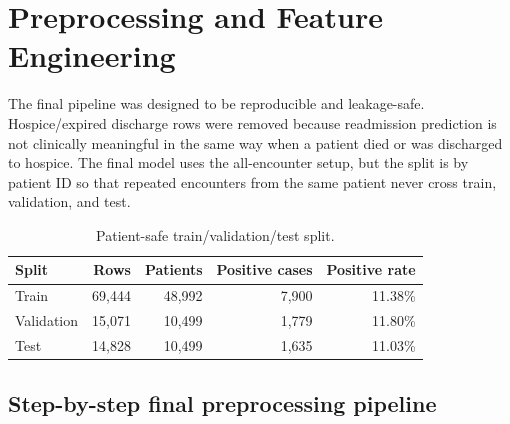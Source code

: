 \documentclass[10pt]{article}
\newcommand{\tightsection}[1]{\vspace{3pt}\section{#1}\vspace{-3pt}}
\newcommand{\tightsubsection}[1]{\vspace{2pt}\subsection{#1}\vspace{-3pt}}
\begin{document}
\tightsection{Preprocessing and Feature Engineering}

The final pipeline was designed to be reproducible and leakage-safe. Hospice/expired discharge rows were removed because readmission prediction is not clinically meaningful in the same way when a patient died or was discharged to hospice. The final model uses the all-encounter setup, but the split is by patient ID so that repeated encounters from the same patient never cross train, validation, and test.

\begin{table}[H]
\centering
\caption{Patient-safe train/validation/test split.}
\small
\begin{tabular}{lrrrr}
\toprule
Split & Rows & Patients & Positive cases & Positive rate \\
\midrule
Train & 69,444 & 48,992 & 7,900 & 11.38\% \\
Validation & 15,071 & 10,499 & 1,779 & 11.80\% \\
Test & 14,828 & 10,499 & 1,635 & 11.03\% \\
\bottomrule
\end{tabular}
\end{table}

\tightsubsection{Step-by-step final preprocessing pipeline}
\end{document}
